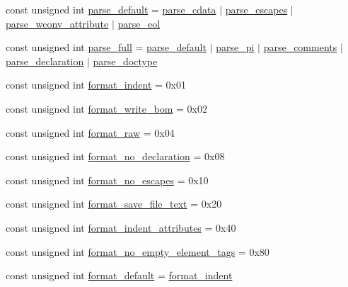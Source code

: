 \begin{DoxyCompactItemize}
\item 
const unsigned int \hyperlink{namespacepugi_ad7c927d1c1752330637c3318b0d7b366}{parse\+\_\+default} = \hyperlink{namespacepugi_a47b679897f8bc15e4e152978fc88c208}{parse\+\_\+cdata} $\vert$ \hyperlink{namespacepugi_ab5ef8454110599611900ff48012c8ad6}{parse\+\_\+escapes} $\vert$ \hyperlink{namespacepugi_a1e943812f2de36fc3ee14f7756afdbd7}{parse\+\_\+wconv\+\_\+attribute} $\vert$ \hyperlink{namespacepugi_ad4e017365d2ff3ee04e226c35129b475}{parse\+\_\+eol}
\item 
const unsigned int \hyperlink{namespacepugi_a7d773377222d4cb6951297d61605c6a7}{parse\+\_\+full} = \hyperlink{namespacepugi_ad7c927d1c1752330637c3318b0d7b366}{parse\+\_\+default} $\vert$ \hyperlink{namespacepugi_a8fb7ea408d60b4f2ca79dd30b651f545}{parse\+\_\+pi} $\vert$ \hyperlink{namespacepugi_adcab316176bfaf69158339962fb4ad38}{parse\+\_\+comments} $\vert$ \hyperlink{namespacepugi_adb5db03ce720dcd90e900b9bb7e70427}{parse\+\_\+declaration} $\vert$ \hyperlink{namespacepugi_afa993ffcd3e228d21f48071e7c097f32}{parse\+\_\+doctype}
\item 
const unsigned int \hyperlink{namespacepugi_ace12e8dee65c5bae8ee42a64be7421d3}{format\+\_\+indent} = 0x01
\item 
const unsigned int \hyperlink{namespacepugi_ab863bcafd203aeaa98953df3a998243f}{format\+\_\+write\+\_\+bom} = 0x02
\item 
const unsigned int \hyperlink{namespacepugi_a2dd811716b1c0a6a2431ceca43bc649e}{format\+\_\+raw} = 0x04
\item 
const unsigned int \hyperlink{namespacepugi_a0ec33e4db09260718f7003ed091f5a1b}{format\+\_\+no\+\_\+declaration} = 0x08
\item 
const unsigned int \hyperlink{namespacepugi_ae8d833b4cabc60ba64536d57669454fd}{format\+\_\+no\+\_\+escapes} = 0x10
\item 
const unsigned int \hyperlink{namespacepugi_ab0aae01dc0b870a2673c32ca6623ae09}{format\+\_\+save\+\_\+file\+\_\+text} = 0x20
\item 
const unsigned int \hyperlink{namespacepugi_a8aafe40e9dd0c345786d01e875b65dd4}{format\+\_\+indent\+\_\+attributes} = 0x40
\item 
const unsigned int \hyperlink{namespacepugi_a0318259e65577c13b172d3a9995aab6c}{format\+\_\+no\+\_\+empty\+\_\+element\+\_\+tags} = 0x80
\item 
const unsigned int \hyperlink{namespacepugi_a325f48a35abbaeacdfd8b7fc9ed1713c}{format\+\_\+default} = \hyperlink{namespacepugi_ace12e8dee65c5bae8ee42a64be7421d3}{format\+\_\+indent}
\end{DoxyCompactItemize}


